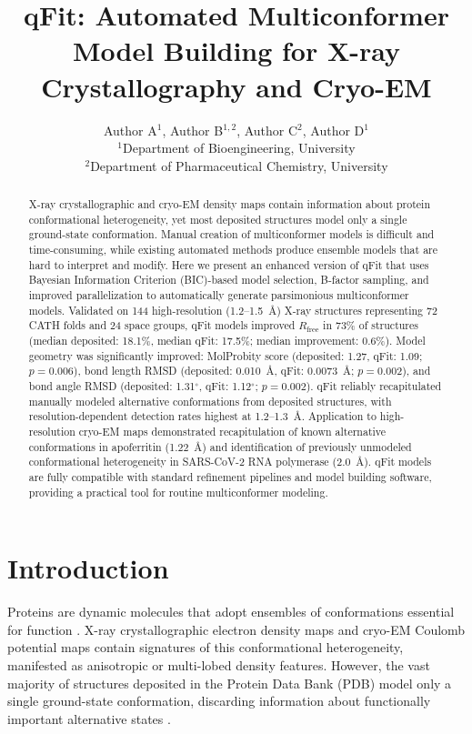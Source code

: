 \documentclass[11pt]{article}
\title{qFit: Automated Multiconformer Model Building for X-ray Crystallography and Cryo-EM}
\author{Author A$^{1}$, Author B$^{1,2}$, Author C$^{2}$, Author D$^{1}$ \\
\small $^{1}$Department of Bioengineering, University \\
\small $^{2}$Department of Pharmaceutical Chemistry, University}
\date{}
\begin{document}
\maketitle

\begin{abstract}
X-ray crystallographic and cryo-EM density maps contain information about protein conformational heterogeneity, yet most deposited structures model only a single ground-state conformation. Manual creation of multiconformer models is difficult and time-consuming, while existing automated methods produce ensemble models that are hard to interpret and modify. Here we present an enhanced version of qFit that uses Bayesian Information Criterion (BIC)-based model selection, B-factor sampling, and improved parallelization to automatically generate parsimonious multiconformer models. Validated on 144 high-resolution (1.2--1.5~\AA) X-ray structures representing 72 CATH folds and 24 space groups, qFit models improved $R_{\text{free}}$ in 73\% of structures (median deposited: 18.1\%, median qFit: 17.5\%; median improvement: 0.6\%). Model geometry was significantly improved: MolProbity score (deposited: 1.27, qFit: 1.09; $p = 0.006$), bond length RMSD (deposited: 0.010~\AA, qFit: 0.0073~\AA; $p = 0.002$), and bond angle RMSD (deposited: 1.31$^{\circ}$, qFit: 1.12$^{\circ}$; $p = 0.002$). qFit reliably recapitulated manually modeled alternative conformations from deposited structures, with resolution-dependent detection rates highest at 1.2--1.3~\AA. Application to high-resolution cryo-EM maps demonstrated recapitulation of known alternative conformations in apoferritin (1.22~\AA) and identification of previously unmodeled conformational heterogeneity in SARS-CoV-2 RNA polymerase (2.0~\AA). qFit models are fully compatible with standard refinement pipelines and model building software, providing a practical tool for routine multiconformer modeling.
\end{abstract}

\section{Introduction}

Proteins are dynamic molecules that adopt ensembles of conformations essential for function \citep{fraser2011accessing, keedy2015crystal}. X-ray crystallographic electron density maps and cryo-EM Coulomb potential maps contain signatures of this conformational heterogeneity, manifested as anisotropic or multi-lobed density features. However, the vast majority of structures deposited in the Protein Data Bank (PDB) model only a single ground-state conformation, discarding information about functionally important alternative states \citep{xray_diffraction_basics2010}.
\end{document}
